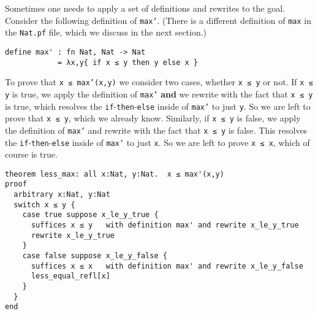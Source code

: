 \documentclass[12pt]{article}
\begin{document}
Sometimes one needs to apply a set of definitions and rewrites to the
goal. Consider the following definition of \texttt{max'}.
(There is a different definition of \texttt{max} in the
\texttt{Nat.pf} file, which we discuss in the next section.)

\begin{verbatim}
define max' : fn Nat, Nat -> Nat
            = λx,y{ if x ≤ y then y else x }
\end{verbatim}

To prove that \texttt{x ≤ max'(x,y)} we consider two cases, whether
\texttt{x ≤ y} or not. If \texttt{x ≤ y} is true, we apply the
definition of \texttt{max'} \textbf{and} we rewrite with the fact that
\texttt{x ≤ y} is true, which resolves the
\texttt{if}-\texttt{then}-\texttt{else} inside of \texttt{max'} to
just \texttt{y}. So we are left to prove that \texttt{x ≤ y}, which we
already know.  Similarly, if \texttt{x ≤ y} is false, we apply the
definition of \texttt{max'} and rewrite with the fact that \texttt{x ≤
  y} is false. This resolves the
\texttt{if}-\texttt{then}-\texttt{else} inside of \texttt{max'} to
just \texttt{x}. So we are left to prove \texttt{x ≤ x}, which of
course is true.

\begin{verbatim}
theorem less_max: all x:Nat, y:Nat.  x ≤ max'(x,y)
proof
  arbitrary x:Nat, y:Nat
  switch x ≤ y {
    case true suppose x_le_y_true {
      suffices x ≤ y   with definition max' and rewrite x_le_y_true
      rewrite x_le_y_true
    }
    case false suppose x_le_y_false {
      suffices x ≤ x   with definition max' and rewrite x_le_y_false
      less_equal_refl[x]
    }
  }
end
\end{verbatim}
\end{document}
